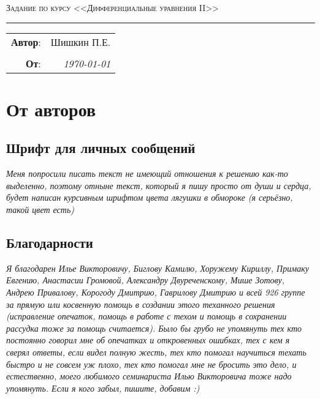 \documentclass{article}
\begin{document}
\setlength{\abovedisplayskip}{3pt}
\setlength{\abovedisplayshortskip}{3pt}
\setlength{\belowdisplayskip}{3pt}
\setlength{\belowdisplayshortskip}{3pt}


\begin{center}
    \LARGE \textsc{Задание по курсу <<Дифференциальные уравнения II>>}
\end{center}

\hrule

\phantom{42}

\begin{flushright}
    \begin{tabular}{rr}
        \textbf{Автор}: 
        & Шишкин П.Е. \\ 
        &\\
        \textbf{От}: &
        \textit{\today}\\
    \end{tabular}
\end{flushright}

\thispagestyle{empty}
\tableofcontents 
\newpage


\section{От авторов}
\subsection{Шрифт для личных сообщений}
\textcolor[rgb]{0.480469, 0.566406, 0.480469}{\textit{Меня попросили писать текст не имеющий отношения к решению как-то выделенно, поэтому отныне текст, который я пишу просто от души и сердца, будет написан курсивным шрифтом цвета лягушки в обмороке (я серьёзно, такой цвет есть)}}
\subsection{Благодарности}\label{thxs}                                            
\textcolor[rgb]{0.480469,0.566406,0.480469}{\textit{Я благодарен Илье Викторовичу, Биглову Камилю, Хоружему Кириллу, Примаку Евгению, Анастасии Громовой, Александру Двуреченскому, Мише Зотову, Андрею Привалову, Корогоду Дмитрию, Гаврилову Дмитрию и всей 926 группе за прямую или косвенную помощь в создании этого теханного решения (исправление опечаток, помощь в работе с техом и помощь в сохранении рассудка тоже за помощь считается). Было бы грубо не упомянуть тех кто постоянно говорил мне об опечатках и откровенных ошибках, тех с кем я сверял ответы, если видел полную жесть, тех кто помогал научиться техать быстро и не совсем уж плохо, тех кто помогал мне не бросить это дело, и естественно, моего любимого семинариста Илью Викторовича тоже надо упомянуть. Если я кого забыл, пишите, добавим :)}}
\end{document}
